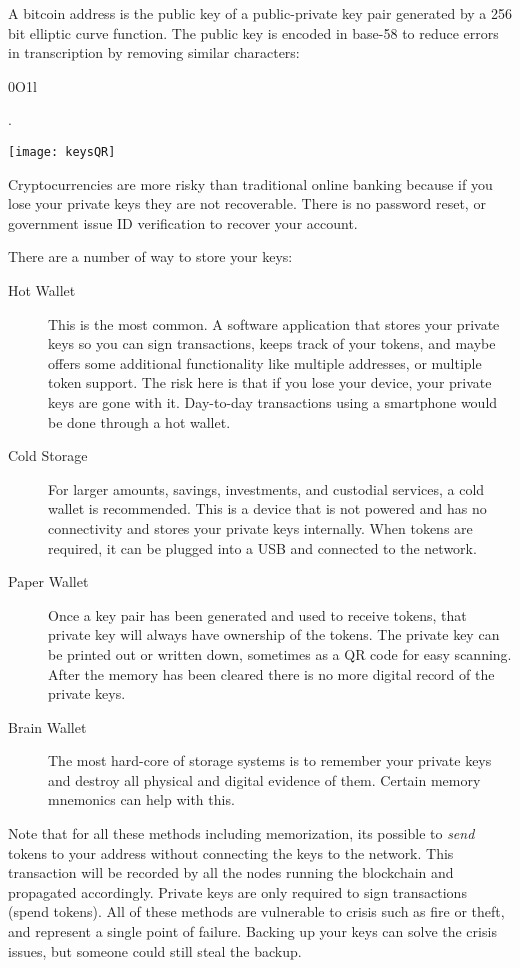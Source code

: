 A bitcoin address is the public key of a public-private key pair generated by a 256 bit elliptic curve function. The public key is encoded in base-58 to reduce errors in transcription by removing similar characters: \begin{code}0O1l\end{code}.
\begin{center}
	\texttt{[image: keysQR]}\end{center}
Cryptocurrencies are more risky than traditional online banking because if you lose your private keys they are not recoverable. There is no password reset, or government issue ID verification to recover your account. 

There are a number of way to store your keys:
\begin{description}
	\item[Hot Wallet] This is the most common. A software application that stores your private keys so you can sign transactions, keeps track of your tokens, and maybe offers some additional functionality like multiple addresses, or multiple token support. The risk here is that if you lose your device, your private keys are gone with it. Day-to-day transactions using a smartphone would be done through a hot wallet.
	\item[Cold Storage] For larger amounts, savings, investments, and custodial services, a cold wallet is recommended. This is a device that is not powered and has no connectivity and stores your private keys internally. When tokens are required, it can be plugged into a USB and connected to the network. 
	\item[Paper Wallet] Once a key pair has been generated and used to receive tokens, that private key will always have ownership of the tokens. The private key can be printed out or written down, sometimes as a QR code for easy scanning. After the memory has been cleared there is no more digital record of the private keys.
	\item[Brain Wallet] The most hard-core of storage systems is to remember your private keys and destroy all physical and digital evidence of them. Certain memory mnemonics can help with this. 
\end{description}	
Note that for all these methods including memorization, its possible to \textit{send} tokens to your address without connecting the keys to the network. This transaction will be recorded by all the nodes running the blockchain and propagated accordingly. Private keys are only required to sign transactions (spend tokens). All of these methods are vulnerable to crisis such as fire or theft, and represent a single point of failure. Backing up your keys can solve the crisis issues, but someone could still steal the backup. 

